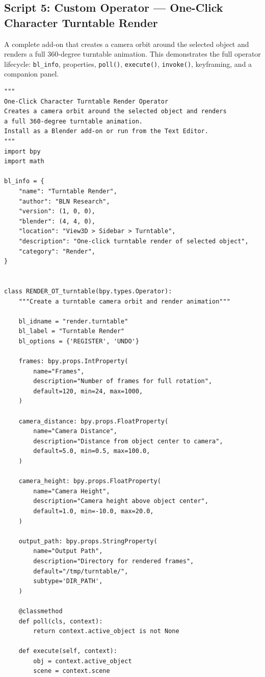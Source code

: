\subsection{Script 5: Custom Operator --- One-Click Character Turntable Render}

A complete add-on that creates a camera orbit around the selected object and renders a full 360-degree turntable animation. This demonstrates the full operator lifecycle: \texttt{bl\_info}, properties, \texttt{poll()}, \texttt{execute()}, \texttt{invoke()}, keyframing, and a companion panel.

\begin{lstlisting}
"""
One-Click Character Turntable Render Operator
Creates a camera orbit around the selected object and renders
a full 360-degree turntable animation.
Install as a Blender add-on or run from the Text Editor.
"""
import bpy
import math

bl_info = {
    "name": "Turntable Render",
    "author": "BLN Research",
    "version": (1, 0, 0),
    "blender": (4, 4, 0),
    "location": "View3D > Sidebar > Turntable",
    "description": "One-click turntable render of selected object",
    "category": "Render",
}


class RENDER_OT_turntable(bpy.types.Operator):
    """Create a turntable camera orbit and render animation"""

    bl_idname = "render.turntable"
    bl_label = "Turntable Render"
    bl_options = {'REGISTER', 'UNDO'}

    frames: bpy.props.IntProperty(
        name="Frames",
        description="Number of frames for full rotation",
        default=120, min=24, max=1000,
    )

    camera_distance: bpy.props.FloatProperty(
        name="Camera Distance",
        description="Distance from object center to camera",
        default=5.0, min=0.5, max=100.0,
    )

    camera_height: bpy.props.FloatProperty(
        name="Camera Height",
        description="Camera height above object center",
        default=1.0, min=-10.0, max=20.0,
    )

    output_path: bpy.props.StringProperty(
        name="Output Path",
        description="Directory for rendered frames",
        default="/tmp/turntable/",
        subtype='DIR_PATH',
    )

    @classmethod
    def poll(cls, context):
        return context.active_object is not None

    def execute(self, context):
        obj = context.active_object
        scene = context.scene


\end{lstlisting}
